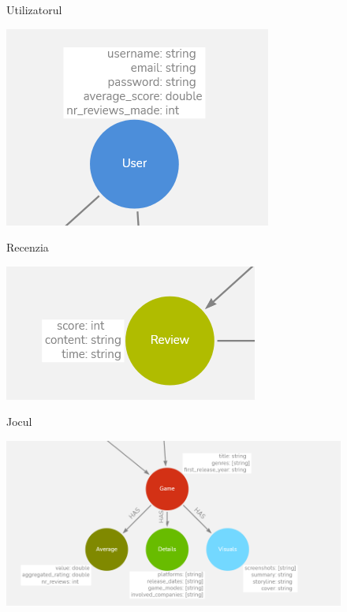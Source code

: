 \documentclass[12pt,a4paper]{report}
\begin{document}
\begin{figure}[H]
\centering
\caption{Utilizatorul}
\begin{adjustbox}{max size={\textwidth}{\textheight}}
\includegraphics[]{exemplu_6_neo4j}
\end{adjustbox}
\caption*{}
\end{figure}

\begin{figure}[H]
\centering
\caption{Recenzia}
\begin{adjustbox}{max size={\textwidth}{\textheight}}
\includegraphics[]{exemplu_7_neo4j}
\end{adjustbox}
\caption*{}
\end{figure}

\begin{figure}[H]
\centering
\caption{Jocul}
\begin{adjustbox}{max size={\textwidth}{\textheight}}
\includegraphics[scale = 0.6]{exemplu_8_neo4j}
\end{adjustbox}
\caption*{}
\end{figure}
\end{document}
